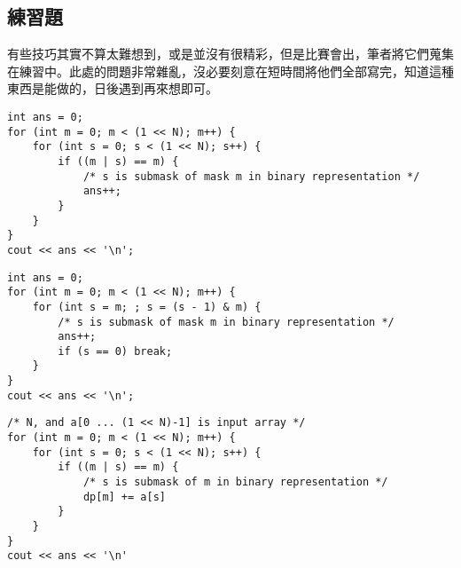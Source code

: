 \subsection{練習題}
有些技巧其實不算太難想到，或是並沒有很精彩，但是比賽會出，筆者將它們蒐集在練習中。此處的問題非常雜亂，沒必要刻意在短時間將他們全部寫完，知道這種東西是能做的，日後遇到再來想即可。
\begin{lstlisting}[caption=待證明程式碼]
int ans = 0;
for (int m = 0; m < (1 << N); m++) {
    for (int s = 0; s < (1 << N); s++) {
        if ((m | s) == m) {
            /* s is submask of mask m in binary representation */
            ans++;
        }
    }
}
cout << ans << '\n';
\end{lstlisting}
\begin{lstlisting}[caption=待證明程式碼]
int ans = 0;
for (int m = 0; m < (1 << N); m++) {
    for (int s = m; ; s = (s - 1) & m) {
        /* s is submask of mask m in binary representation */
        ans++;
        if (s == 0) break;
    }
}
cout << ans << '\n';
\end{lstlisting}
\begin{lstlisting}[caption=Sum Over Subset]
/* N, and a[0 ... (1 << N)-1] is input array */
for (int m = 0; m < (1 << N); m++) {
    for (int s = 0; s < (1 << N); s++) {
        if ((m | s) == m) {
            /* s is submask of m in binary representation */
            dp[m] += a[s]
        }
    }
}
cout << ans << '\n'
\end{lstlisting}

\newpage
